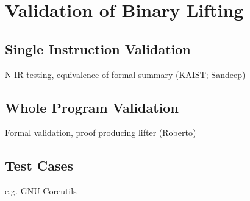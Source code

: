 
\section{Validation of Binary Lifting}


\subsection{Single Instruction Validation}

N-IR testing, equivalence of formal summary (KAIST; Sandeep)


\subsection{Whole Program Validation}

Formal validation, proof producing lifter (Roberto)


\subsection{Test Cases}

e.g. GNU Coreutils
